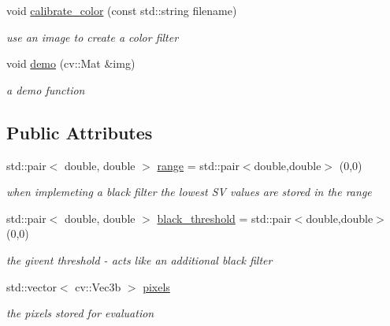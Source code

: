 \begin{DoxyCompactItemize}
\mbox{\label{class_color___processing_acb962976dba3538eabcf5812951a023e}} 
void \mbox{\hyperlink{class_color___processing_acb962976dba3538eabcf5812951a023e}{calibrate\+\_\+color}} (const std\+::string filename)
\begin{DoxyCompactList}\small\item\em use an image to create a color filter \end{DoxyCompactList}\item 
\mbox{\label{class_color___processing_aa5007ebc7ce0250d5028ee718bace4d4}} 
void \mbox{\hyperlink{class_color___processing_aa5007ebc7ce0250d5028ee718bace4d4}{demo}} (cv\+::\+Mat \&img)
\begin{DoxyCompactList}\small\item\em a demo function \end{DoxyCompactList}\end{DoxyCompactItemize}
\subsection*{Public Attributes}
\begin{DoxyCompactItemize}
\item 
\mbox{\label{class_color___processing_a5769c226ab5a68929b0b5894d35dbb57}} 
std\+::pair$<$ double, double $>$ \mbox{\hyperlink{class_color___processing_a5769c226ab5a68929b0b5894d35dbb57}{range}} = std\+::pair$<$double,double$>$ (0,0)
\begin{DoxyCompactList}\small\item\em when implemeting a black filter the lowest SV values are stored in the range \end{DoxyCompactList}\item 
\mbox{\label{class_color___processing_a46734d34d9efc70a1e15dcece2a2336e}} 
std\+::pair$<$ double, double $>$ \mbox{\hyperlink{class_color___processing_a46734d34d9efc70a1e15dcece2a2336e}{black\+\_\+threshold}} = std\+::pair$<$double,double$>$ (0,0)
\begin{DoxyCompactList}\small\item\em the givent threshold -\/ acts like an additional black filter \end{DoxyCompactList}\item 
\mbox{\label{class_color___processing_a8702c050fe8071a91a3d4376b76ac0d5}} 
std\+::vector$<$ cv\+::\+Vec3b $>$ \mbox{\hyperlink{class_color___processing_a8702c050fe8071a91a3d4376b76ac0d5}{pixels}}
\begin{DoxyCompactList}\small\item\em the pixels stored for evaluation \end{DoxyCompactList}\end{DoxyCompactItemize}


